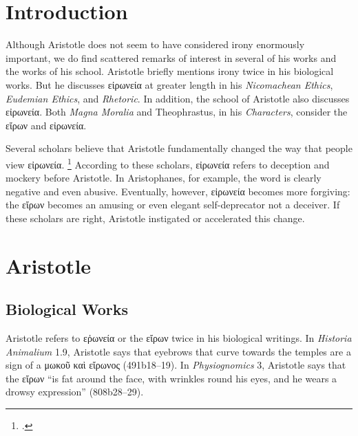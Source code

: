 \documentclass[12pt,letterpaper]{article}
\begin{document}

\pagestyle{notes}

\section*{Introduction}

Although Aristotle does not seem to have considered irony enormously important, we do find scattered remarks of interest in several of his works and the works of his school.
Aristotle briefly mentions irony twice in his biological works.
But he discusses \textgreek{εἰρωνεία} at greater length in his \textit{Nicomachean Ethics}, \textit{Eudemian Ethics}, and \textit{Rhetoric}.
In addition, the school of Aristotle also discusses \textgreek{εἰρωνεία}.
Both \textit{Magna Moralia} and Theophrastus, in his \textit{Characters}, consider the \textgreek{εἴρων} and \textgreek{εἰρωνεία}.

Several scholars believe that Aristotle fundamentally changed the way that people view \textgreek{εἰρωνεία}.
\footcites[See, for example, ][]{ribbeck-begriff-eiron-1876}{gooch-socratic-irony-and-arisotles-eiron-1987}{lane-reconsidering-socratic-irony-2011}
According to these scholars, \textgreek{εἰρωνεία} refers to deception and mockery before Aristotle.
In Aristophanes, for example, the word is clearly negative and even abusive.
Eventually, however, \textgreek{εἰρωνεία} becomes more forgiving: the \textgreek{εἴρων} becomes an amusing or even elegant self-deprecator not a deceiver.
If these scholars are right, Aristotle instigated or accelerated this change.

\section*{Aristotle}

\subsection*{Biological Works}

Aristotle refers to \textgreek{εῤωνεία} or the \textgreek{εἴρων} twice in his biological writings.
In \textit{Historia Animalium} 1.9, Aristotle says that eyebrows that curve towards the temples are a sign of a \textgreek{μωκοῦ καὶ εἴρωνος} (491b18--19).
In \textit{Physiognomics} 3, Aristotle says that the \textgreek{εἴρων} ``is fat around the face, with wrinkles round his eyes, and he wears a drowsy expression'' (808b28--29).
\end{document}
